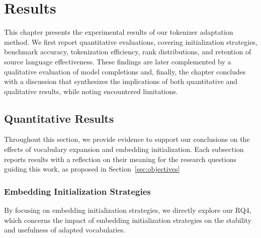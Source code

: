 
\chapter{Results}


\label{chap:results}

This chapter presents the experimental results of our tokenizer adaptation method. We first report quantitative evaluations, covering initialization strategies, benchmark accuracy, tokenization efficiency, rank distributions, and retention of source language effectiveness.
These findings are later complemented by a qualitative evaluation of model completions and, finally, the chapter concludes with a discussion that synthesizes the implications of both quantitative and qualitative results, while noting encountered limitations.


\section{Quantitative Results}

Throughout this section, we provide evidence to support our conclusions on the effects of vocabulary expansion and embedding initialization. Each subsection reports results with a reflection on their meaning for the research questions guiding this work, as proposed in Section~\ref{sec:objectives}


\subsection{Embedding Initialization Strategies}
\label{subsec:results}

By focusing on embedding initialization strategies, we directly explore our RQ4, which concerns the impact of embedding initialization strategies on the stability and usefulness of adapted vocabularies.

